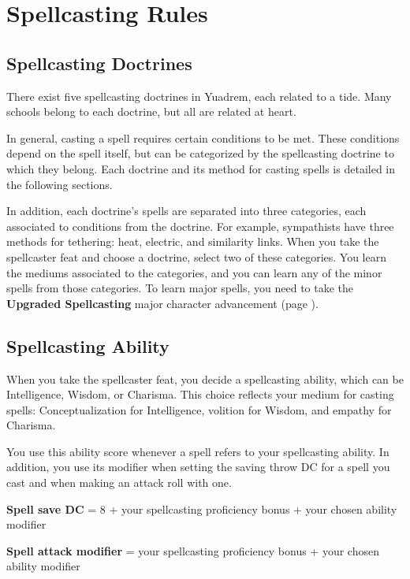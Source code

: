 \section{Spellcasting Rules} \label{sec::spellcastingrules}
\subsection*{Spellcasting Doctrines}
    There exist five spellcasting doctrines in Yuadrem, each related to a tide.
    Many schools belong to each doctrine, but all are related at heart.

    In general, casting a spell requires certain conditions to be met.
    These conditions depend on the spell itself, but can be categorized by the spellcasting doctrine to which they belong.
    Each doctrine and its method for casting spells is detailed in the following sections.

    In addition, each doctrine's spells are separated into three categories, each associated to conditions from the doctrine.
    For example, sympathists have three methods for tethering: heat, electric, and similarity links.
    When you take the spellcaster feat and choose a doctrine, select two of these categories.
    You learn the mediums associated to the categories, and you can learn any of the minor spells from those categories.
    To learn major spells, you need to take the \textbf{Upgraded Spellcasting} major character advancement (page \pageref{feat::upgradedspellcasting}).

\subsection*{Spellcasting Ability}
    When you take the spellcaster feat, you decide a spellcasting ability, which can be Intelligence, Wisdom, or Charisma.
    This choice reflects your medium for casting spells: Conceptualization for Intelligence, volition for Wisdom, and empathy for Charisma.

    You use this ability score whenever a spell refers to your spellcasting ability.
    In addition, you use its modifier when setting the saving throw DC for a spell you cast and when making an attack roll with one.

    \textbf{Spell save DC} = 8 + your spellcasting proficiency bonus + your chosen ability modifier

    \textbf{Spell attack modifier} = your spellcasting proficiency bonus + your chosen ability modifier

